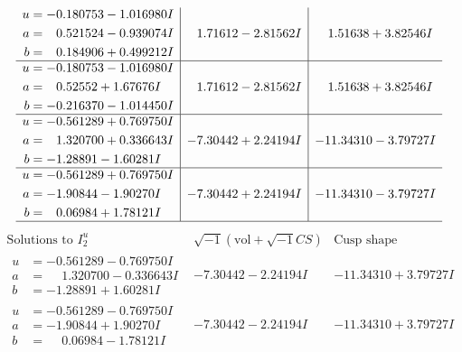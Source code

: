 \documentclass[1p]{elsarticle_modified}
\theoremstyle{definition}
\newcommand{\I}{\sqrt{-1}}
\begin{document}
$$\begin{array}{c|c|c}
\begin{aligned}
u &= -0.180753 - 1.016980 I \\
a &= \phantom{-}0.521524 - 0.939074 I \\
b &= \phantom{-}0.184906 + 0.499212 I\end{aligned}
 & \phantom{-}1.71612 - 2.81562 I & \phantom{-}1.51638 + 3.82546 I \\ \hline\begin{aligned}
u &= -0.180753 - 1.016980 I \\
a &= \phantom{-}0.52552 + 1.67676 I \\
b &= -0.216370 - 1.014450 I\end{aligned}
 & \phantom{-}1.71612 - 2.81562 I & \phantom{-}1.51638 + 3.82546 I \\ \hline\begin{aligned}
u &= -0.561289 + 0.769750 I \\
a &= \phantom{-}1.320700 + 0.336643 I \\
b &= -1.28891 - 1.60281 I\end{aligned}
 & -7.30442 + 2.24194 I & -11.34310 - 3.79727 I \\ \hline\begin{aligned}
u &= -0.561289 + 0.769750 I \\
a &= -1.90844 - 1.90270 I \\
b &= \phantom{-}0.06984 + 1.78121 I\end{aligned}
 & -7.30442 + 2.24194 I & -11.34310 - 3.79727 I\\
 \hline 
 \end{array}$$\newpage$$\begin{array}{c|c|c}  
\text{Solutions to }I^u_{2}& \I (\text{vol} + \sqrt{-1}CS) & \text{Cusp shape}\\
 \hline 
\begin{aligned}
u &= -0.561289 - 0.769750 I \\
a &= \phantom{-}1.320700 - 0.336643 I \\
b &= -1.28891 + 1.60281 I\end{aligned}
 & -7.30442 - 2.24194 I & -11.34310 + 3.79727 I \\ \hline\begin{aligned}
u &= -0.561289 - 0.769750 I \\
a &= -1.90844 + 1.90270 I \\
b &= \phantom{-}0.06984 - 1.78121 I\end{aligned}
 & -7.30442 - 2.24194 I & -11.34310 + 3.79727 I \\ \hline\begin{aligned}

\end{aligned}
\end{array}$$
\end{document}

